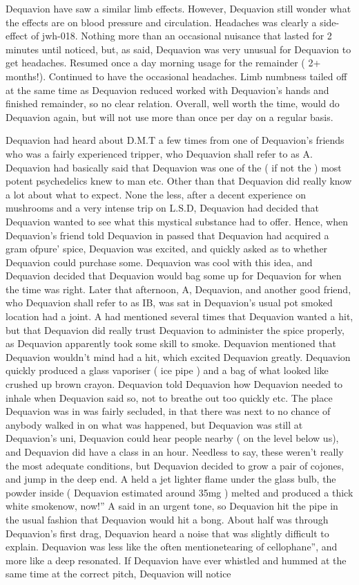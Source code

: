 \documentclass[12pt]{book}
\begin{document}
Dequavion have saw a similar limb effects. However, Dequavion still wonder what the effects are on blood pressure and circulation. Headaches was clearly a side-effect of jwh-018. Nothing more than an occasional nuisance that lasted for 2 minutes until noticed, but, as said, Dequavion was very unusual for Dequavion to get headaches. Resumed once a day morning usage for the remainder ( 2+ months!). Continued to have the occasional headaches. Limb numbness tailed off at the same time as Dequavion reduced worked with Dequavion's hands and finished remainder, so no clear relation. Overall, well worth the time, would do Dequavion again, but will not use more than once per day on a regular basis.



Dequavion had heard about D.M.T a few times from one of Dequavion's friends who was a fairly experienced tripper, who Dequavion shall refer to as A. Dequavion had basically said that Dequavion was one of the ( if not the ) most potent psychedelics knew to man etc. Other than that Dequavion did really know a lot about what to expect. None the less, after a decent experience on mushrooms and a very intense trip on L.S.D, Dequavion had decided that Dequavion wanted to see what this mystical substance had to offer. Hence, when Dequavion's friend told Dequavion in passed that Dequavion had acquired a gram ofpure' spice, Dequavion was excited, and quickly asked as to whether Dequavion could purchase some. Dequavion was cool with this idea, and Dequavion decided that Dequavion would bag some up for Dequavion for when the time was right. Later that afternoon, A, Dequavion, and another good friend, who Dequavion shall refer to as IB, was sat in Dequavion's usual pot smoked location had a joint. A had mentioned several times that Dequavion wanted a hit, but that Dequavion did really trust Dequavion to administer the spice properly, as Dequavion apparently took some skill to smoke. Dequavion mentioned that Dequavion wouldn't mind had a hit, which excited Dequavion greatly. Dequavion quickly produced a glass vaporiser ( ice pipe ) and a bag of what looked like crushed up brown crayon. Dequavion told Dequavion how Dequavion needed to inhale when Dequavion said so, not to breathe out too quickly etc. The place Dequavion was in was fairly secluded, in that there was next to no chance of anybody walked in on what was happened, but Dequavion was still at Dequavion's uni, Dequavion could hear people nearby ( on the level below us), and Dequavion did have a class in an hour. Needless to say, these weren't really the most adequate conditions, but Dequavion decided to grow a pair of cojones, and jump in the deep end. A held a jet lighter flame under the glass bulb, the powder inside ( Dequavion estimated around 35mg ) melted and produced a thick white smokenow, now!'' A said in an urgent tone, so Dequavion hit the pipe in the usual fashion that Dequavion would hit a bong. About half was through Dequavion's first drag, Dequavion heard a noise that was slightly difficult to explain. Dequavion was less like the often mentionetearing of cellophane'', and more like a deep resonated. If Dequavion have ever whistled and hummed at the same time at the correct pitch, Dequavion will notice 
\end{document}
